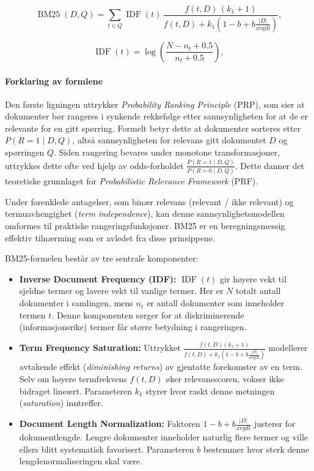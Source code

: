 \begin{equation}
\operatorname{BM25}(D,Q)
=
\sum_{t \in Q}
\operatorname{IDF}(t)\,
\frac{f(t,D)\,(k_1+1)}
{f(t,D) + k_1\left(1-b + b\frac{|D|}{\operatorname{avgdl}}\right)},
\end{equation}

\begin{equation}
\operatorname{IDF}(t)
=
\log\left(\frac{N - n_t + 0.5}{n_t + 0.5}\right),
\end{equation}

\paragraph{Forklaring av formlene}

Den første ligningen uttrykker \textit{Probability Ranking Principle} (PRP), som sier at dokumenter bør rangeres i synkende rekkefølge etter sannsynligheten for at de er relevante for en gitt spørring. Formelt betyr dette at dokumenter sorteres etter $P(R=1 \mid D, Q)$, altså sannsynligheten for relevans gitt dokumentet $D$ og spørringen $Q$. Siden rangering bevares under monotone transformasjoner, uttrykkes dette ofte ved hjelp av odds-forholdet 
$\frac{P(R=1 \mid D,Q)}{P(R=0 \mid D,Q)}$. Dette danner det teoretiske grunnlaget for \textit{Probabilistic Relevance Framework} (PRF).

Under forenklede antagelser, som binær relevans (relevant / ikke relevant) og termuavhengighet (\textit{term independence}), kan denne sannsynlighetsmodellen omformes til praktiske rangeringsfunksjoner. BM25 er en beregningsmessig effektiv tilnærming som er avledet fra disse prinsippene.

BM25-formelen består av tre sentrale komponenter:

\begin{itemize}
    \item \textbf{Inverse Document Frequency (IDF):} 
    $\operatorname{IDF}(t)$ gir høyere vekt til sjeldne termer og lavere vekt til vanlige termer. Her er $N$ totalt antall dokumenter i samlingen, mens $n_t$ er antall dokumenter som inneholder termen $t$. Denne komponenten sørger for at diskriminerende (informasjonsrike) termer får større betydning i rangeringen.

    \item \textbf{Term Frequency Saturation:}
    Uttrykket 
    $\frac{f(t,D)(k_1+1)}{f(t,D) + k_1\left(1-b + b\frac{|D|}{\operatorname{avgdl}}\right)}$
    modellerer avtakende effekt (\textit{diminishing returns}) av gjentatte forekomster av en term. Selv om høyere termfrekvens $f(t,D)$ øker relevansscoren, vokser ikke bidraget lineært. Parameteren $k_1$ styrer hvor raskt denne metningen (\textit{saturation}) inntreffer.

    \item \textbf{Document Length Normalization:}
    Faktoren 
    $1-b + b\frac{|D|}{\operatorname{avgdl}}$
    justerer for dokumentlengde. Lengre dokumenter inneholder naturlig flere termer og ville ellers blitt systematisk favorisert. Parameteren $b$ bestemmer hvor sterk denne lengdenormaliseringen skal være.
\end{itemize}


